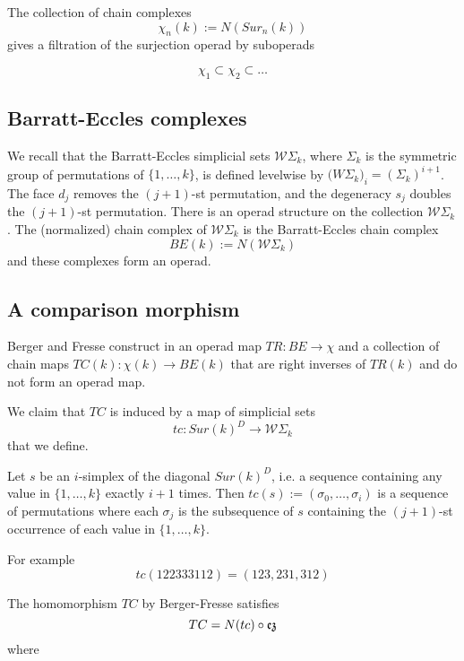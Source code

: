 
The collection of chain complexes
$$\chi_n(k):=N(Sur_n(k))$$
gives a filtration of the surjection operad by suboperads

$$\chi_1 \subset \chi_2 \subset  \dots $$



\subsection{Barratt-Eccles complexes}

We recall that the Barratt-Eccles simplicial sets $\mathcal{W}\Sigma_k$, where  $\Sigma_k$ is the symmetric group of permutations of $\{1,\dots,k\}$, is defined levelwise by
$\mathcal({W}\Sigma_k)_i=(\Sigma_k)^{i+1}$. The face $d_{j}$ removes the $(j+1)$-st permutation, and the degeneracy $s_j$ doubles the $(j+1)$-st permutation. There is an operad structure on the collection $\mathcal{W} \Sigma_k$.
The (normalized) chain complex of $\mathcal{W}\Sigma_k$ is the Barratt-Eccles chain complex $$BE(k):=N(\mathcal{W}\Sigma_k)$$
and these complexes form an operad.

\subsection{A comparison morphism}

Berger and Fresse construct in \cite{BFsmall}
  an operad map $TR:BE \to \chi$
and a collection of
chain maps $TC(k):\chi(k) \to BE(k)$
that are right inverses of $TR(k)$ and do not form an operad map.

We claim that $TC$ is induced by a map of simplicial sets
$$tc: Sur(k)^D \to \mathcal{W}\Sigma_k$$ that we define.
\begin{definition}
Let $s$ be an $i$-simplex  of the diagonal $Sur(k)^D$, i.e. a sequence containing any value in $\{1,\dots,k\}$ exactly $i+1$ times.
Then $tc(s):=(\sigma_0,\dots,\sigma_i)$ is a sequence of permutations where each $\sigma_j$ is the subsequence of $s$ containing the $(j+1)$-st occurrence of each value in $\{1,\dots,k\}$.
 \end{definition}

 For example
 $$tc(122333112)=(123,231,312)$$

\begin{proposition}
The homomorphism $TC$ by Berger-Fresse satisfies
$$TC=N(tc) \circ \operatorname{\mathfrak{ez}}$$ where
\end{proposition}

